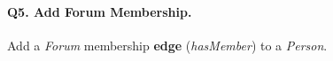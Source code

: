 \paragraph{\textbf{Q5}. Add Forum Membership.}
Add a \emph{Forum} membership \textbf{edge} (\emph{hasMember}) to a
\emph{Person}.
